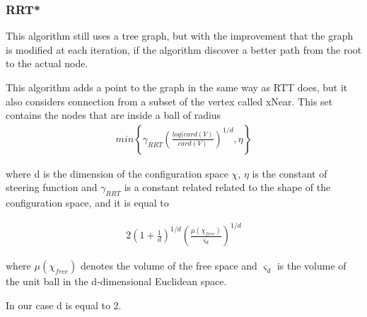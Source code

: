 \documentclass[10pt]{article}
\begin{document}
	\subsubsection{RRT*}
	
	This algorithm still uses a tree graph, but with the improvement that the graph is modified at each iteration, if the algorithm discover a better path from the root to the actual node.
	
	This algorithm adds a point to the graph in the same way as RTT does, but it also considers connection from a subset of the vertex called xNear. This set contains the nodes that are inside a ball of radius 
	\begin{align}
		 min\left\{\gamma_{RRT}\left(\frac{log(card(V)}{card(V)}\right)^{1/d},\eta\right\}
		\nonumber
	\end{align}
	
	where d is the dimension of the configuration space $\chi$, $\eta$ is the constant of steering function and $\gamma_{RRT}$ is a constant related related to the shape of the configuration space, and it is equal to
	
	\begin{align}
	2\left(1+\frac{1}{d}\right)^{1/d} \left(\frac{\mu(\chi_{free})}{\varsigma_{d}}\right)^{1/d}
	\nonumber
	\end{align}
	
	where  $\mu(\chi_{free})$ denotes the volume of the free space and $\varsigma_{d}$ is the volume of the unit ball in the d-dimensional 	Euclidean space.
	
	In our case d is equal to 2.
	
\end{document}
